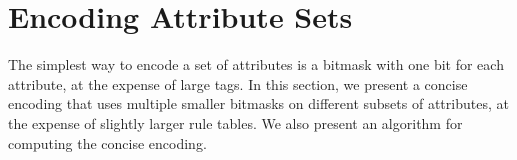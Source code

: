 \section{Encoding Attribute Sets}
\label{sec:flextag_encoding} 
The simplest way to encode a set of attributes is a bitmask with one
bit for each attribute, at the expense of large tags.  In this
section, we present a concise encoding that uses multiple smaller
bitmasks on different subsets of attributes, at the expense of
slightly larger rule tables.  We also present an algorithm for
computing the concise encoding.


